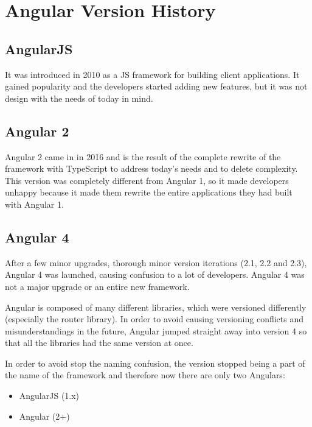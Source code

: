 \chapter{Angular Version History}
\section{AngularJS}
It was introduced in 2010 as a JS framework for building client applications. It gained popularity and the developers started adding new features, but it was not design with the needs of today in mind.

\section{Angular 2}
Angular 2 came in in 2016 and is the result of the complete rewrite of the framework with TypeScript to address today's needs and to delete complexity. This version was completely different from Angular 1, so it made developers unhappy because it made them rewrite the entire applications they had built with Angular 1.

\section{Angular 4}
After a few minor upgrades, thorough minor version iterations (2.1, 2.2 and 2.3), Angular 4 was launched, causing confusion to a lot of developers. Angular 4 was not a major upgrade or an entire new framework.

Angular is composed of many different libraries, which were versioned differently (especially the router library). In order to avoid causing versioning conflicts and misunderstandings in the future, Angular jumped straight away into version 4 so that all the libraries had the same version at once.

In order to avoid stop the naming confusion, the version stopped being a part of the name of the framework and therefore now there are only two Angulars:

\begin{itemize}
    \item AngularJS (1.x)
    \item Angular (2+)
\end{itemize}